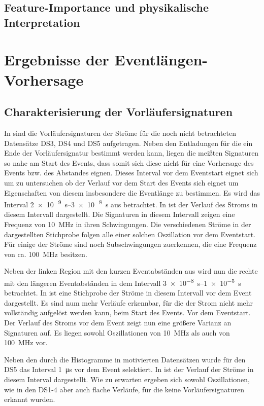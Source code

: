 \subsection{Feature-Importance und physikalische Interpretation}

\section{Ergebnisse der Eventlängen-Vorhersage}

\subsection{Charakterisierung der Vorläufersignaturen}
In  sind die Vorläufersignaturen der Ströme für die noch nicht betrachteten Datensätze DS3, DS4 und DS5 aufgetragen.
Neben den Entladungen für die ein Ende der Vorläufersignatur bestimmt werden kann, liegen die meißten Signaturen so nahe am Start des Events, dass somit sich diese nicht für eine Vorhersage des Events bzw. des Abstandes eignen. Dieses Interval vor dem Eventstart eignet sich um zu untersuchen ob der Verlauf vor dem Start des Events sich eignet um Eigenschaften von diesem insbesondere die Eventlänge zu bestimmen. Es wird das Interval \SIrange{2e-9}{3e-8}{\second} aus  betrachtet. In  ist der Verlauf des Stroms in diesem Intervall dargestellt. Die Signaturen in diesem Intervall zeigen eine Frequenz von \SI{10}{\mega\hertz} in ihren Schwingungen. Die verschiedenen Ströme in der dargestellten Stichprobe folgen alle einer solchen Oszillation vor dem Eventstart. Für einige der Ströme sind noch Subschwingungen zuerkennen, die eine Frequenz von ca. \SI{100}{\mega\hertz} besitzen.  

Neben der linken Region mit den kurzen Eventabständen aus  wird nun die rechte mit den längeren Eventabständen in dem Intervall \SIrange{3e-8}{1e-5}{\second} betrachtet. In  ist eine Stichprobe der Ströme in diesem Intervall vor dem Event dargestellt. Es sind num mehr Verläufe erkennbar, für die der Strom nicht mehr vollständig aufgelöst werden kann, beim Start des Events. Vor dem Eventstart. Der Verlauf des Stroms vor dem Event zeigt nun eine größere Varianz an Signaturen auf. Es liegen sowohl Oszillationen von \SI{10}{\mega\hertz} als auch von \SI{100}{\mega\hertz} vor. 

Neben den durch die Histogramme in  motivierten Datensätzen wurde für den DS5 das Interval \SI{1}{\micro\second} vor dem Event selektiert. In  ist der Verlauf der Ströme in diesem Interval dargestellt. Wie zu erwarten ergeben sich sowohl Oszillationen, wie in den DS1-4 aber auch flache Verläufe, für die keine Vorläufersignaturen erkannt wurden. 


